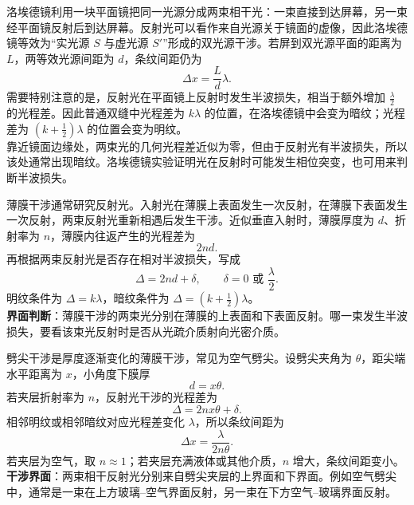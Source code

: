 \begin{casetypebox}[title={\strut\textcolor{white}{\bfseries 常见题型：洛埃德镜}}]
洛埃德镜利用一块平面镜把同一光源分成两束相干光：一束直接到达屏幕，另一束经平面镜反射后到达屏幕。反射光可以看作来自光源关于镜面的虚像，因此洛埃德镜等效为“实光源 $S$ 与虚光源 $S'$”形成的双光源干涉。若屏到双光源平面的距离为 $L$，两等效光源间距为 $d$，条纹间距仍为
\[
  \Delta x=\frac{L}{d}\lambda.
\]
需要特别注意的是，反射光在平面镜上反射时发生半波损失，相当于额外增加 $\frac{\lambda}{2}$ 的光程差。因此普通双缝中光程差为 $k\lambda$ 的位置，在洛埃德镜中会变为暗纹；光程差为 $(k+\frac12)\lambda$ 的位置会变为明纹。\\

靠近镜面边缘处，两束光的几何光程差近似为零，但由于反射光有半波损失，所以该处通常出现暗纹。洛埃德镜实验证明光在反射时可能发生相位突变，也可用来判断半波损失。
\end{casetypebox}

\begin{casetypebox}[title={\strut\textcolor{white}{\bfseries 常见题型：薄膜干涉}}]
薄膜干涉通常研究反射光。入射光在薄膜上表面发生一次反射，在薄膜下表面发生一次反射，两束反射光重新相遇后发生干涉。近似垂直入射时，薄膜厚度为 $d$、折射率为 $n$，薄膜内往返产生的光程差为
\[
  2nd.
\]
再根据两束反射光是否存在相对半波损失，写成
\[
  \Delta=2nd+\delta,\qquad \delta=0\text{ 或 }\frac{\lambda}{2}.
\]
明纹条件为 $\Delta=k\lambda$，暗纹条件为 $\Delta=(k+\frac12)\lambda$。\\

\textbf{界面判断}：薄膜干涉的两束光分别在薄膜的上表面和下表面反射。哪一束发生半波损失，要看该束光反射时是否从光疏介质射向光密介质。
\end{casetypebox}

\begin{casetypebox}[title={\strut\textcolor{white}{\bfseries 常见题型：劈尖干涉}}]
劈尖干涉是厚度逐渐变化的薄膜干涉，常见为空气劈尖。设劈尖夹角为 $\theta$，距尖端水平距离为 $x$，小角度下膜厚
\[
  d=x\theta.
\]
若夹层折射率为 $n$，反射光干涉的光程差为
\[
  \Delta=2n x\theta+\delta.
\]
相邻明纹或相邻暗纹对应光程差变化 $\lambda$，所以条纹间距为
\[
  \Delta x=\frac{\lambda}{2n\theta}.
\]
若夹层为空气，取 $n\approx1$；若夹层充满液体或其他介质，$n$ 增大，条纹间距变小。\\

\textbf{干涉界面}：两束相干反射光分别来自劈尖夹层的上界面和下界面。例如空气劈尖中，通常是一束在上方玻璃--空气界面反射，另一束在下方空气--玻璃界面反射。
\end{casetypebox}

